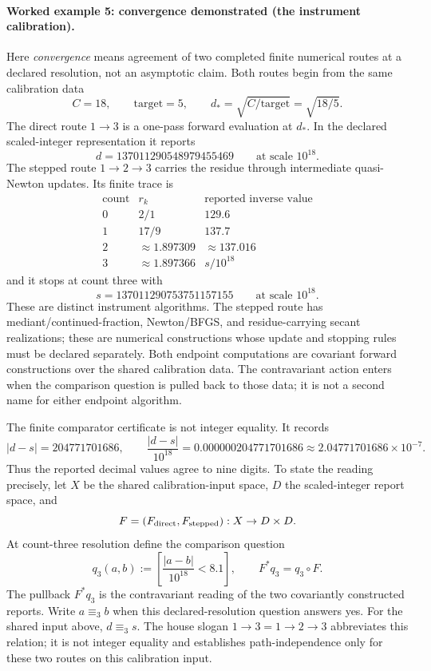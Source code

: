 \paragraph{Worked example 5: convergence demonstrated (the instrument calibration).}
Here \emph{convergence} means agreement of two completed finite numerical routes at a declared resolution, not an
asymptotic claim.  Both routes begin from the same calibration data
\[
                   C=18,\qquad \text{target}=5,\qquad
                   d_*=\sqrt{C/\text{target}}=\sqrt{18/5}.
\]
The direct route \(1\to3\) is a one-pass forward evaluation at \(d_*\).  In the declared scaled-integer
representation it reports
\[
 d=137011290548979455469\qquad\text{at scale }10^{18}.
\]
The stepped route \(1\to2\to3\) carries the residue through intermediate quasi-Newton updates.  Its finite trace is
\[
\begin{array}{c|c|c}
\text{count}&r_k&\text{reported inverse value}\\
\hline
0&2/1&129.6\\
1&17/9&137.7\\
2&\approx1.897309&\approx137.016\\
3&\approx1.897366&s/10^{18}
\end{array}
\]
and it stops at count three with
\[
 s=137011290753751157155\qquad\text{at scale }10^{18}.
\]
These are distinct instrument algorithms.  The stepped route
has mediant/continued-fraction, Newton/BFGS, and residue-carrying secant realizations; these are numerical constructions
whose update and stopping rules must be declared separately.  Both endpoint computations are covariant forward
constructions over the shared calibration data.  The contravariant action enters when the comparison question is
pulled back to those data; it is not a second name for either endpoint algorithm.

The finite comparator certificate is not integer equality.  It records
\[
 |d-s|=204771701686,\qquad
 \frac{|d-s|}{10^{18}}=0.000000204771701686
 \approx2.04771701686\times10^{-7}.
\]
Thus the reported decimal values agree to nine digits.  To state the reading precisely, let \(X\) be the shared
calibration-input space, \(D\) the scaled-integer report space, and
\[
 F=(F_{\rm direct},F_{\rm stepped}):X\to D\times D.
\]
At count-three resolution define the comparison question
\[
 q_3(a,b):=\left[\frac{|a-b|}{10^{18}}<8.1\right],
 \qquad F^*q_3=q_3\circ F.
\]
The pullback \(F^*q_3\) is the contravariant reading of the two covariantly constructed reports.  Write
\(a\equiv_3 b\) when this declared-resolution question answers yes.  For the shared input above,
\(d\equiv_3s\).  The house slogan \(1\to3=1\to2\to3\) abbreviates this relation; it is not integer equality and
establishes path-independence only for these two routes on this calibration input.

